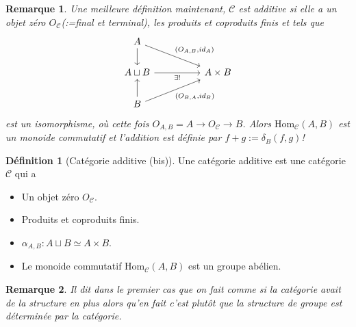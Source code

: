 \documentclass[a4paper,12pt]{book}
\newcommand{\Cat}{\mathcal{C}}
\newcommand{\Hom}{\textrm{Hom}}
\theoremstyle{plain}
\newtheorem{rem}{Remarque}
\theoremstyle{definition}
\newtheorem{defn}[subsection]{Définition}
\theoremstyle{remark}
\begin{document}
\begin{rem}
    Une meilleure définition maintenant, $\Cat$ est additive si
    elle a un objet zéro $O_{\Cat}$(:=final et terminal), les produits et
    coproduits finis et tels que 
\[\begin{tikzcd}
	A \\
	{A\sqcup B} && {A\times B} \\
	B
	\arrow[from=1-1, to=2-1]
	\arrow["{(O_{A,B},id_A)}", from=1-1, to=2-3]
	\arrow["{\exists !}"', from=2-1, to=2-3]
	\arrow[from=3-1, to=2-1]
	\arrow["{(O_{B,A},id_B)}"', from=3-1, to=2-3]
\end{tikzcd}\]
    est un isomorphisme, où cette fois $O_{A,B}=A\to O_{\Cat}\to B$.
    Alors $\Hom_{\Cat}(A,B)$ est un monoide commutatif et l'addition
    est définie par $f+g:=\delta_B(f,g)$!
\end{rem}
\begin{defn}[Catégorie additive (bis)]
    Une catégorie additive est une catégorie $\Cat$ qui a 
    \begin{itemize}
	\item Un objet zéro $O_{\Cat}$.
	\item Produits et coproduits finis.
	\item $\alpha_{A,B}\colon A\sqcup B\simeq A\times B$.
	\item Le monoide commutatif $\Hom_{\Cat}(A,B)$ est
	    un groupe abélien.
    \end{itemize}
\end{defn}
\begin{rem}
    Il dit dans le premier cas que on fait comme si la catégorie
    avait de la structure en plus alors qu'en fait c'est plutôt 
    que la structure de groupe est déterminée par la catégorie.
\end{rem}
\end{document}
